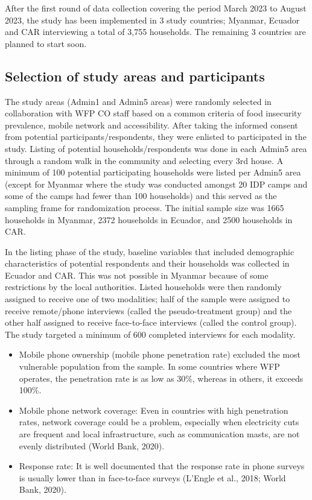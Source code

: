 \documentclass[11pt,harvard]{article}
\begin{document}
After the first round of data collection covering the period March 2023 to August 2023, the study has been implemented in 3 study countries; Myanmar, Ecuador and CAR interviewing a total of 3,755 households. The remaining 3 countries are planned to start soon.

	\subsection{Selection of study areas and participants}

The study areas (Admin1 and Admin5 areas) were randomly selected in collaboration with WFP CO staff based on a common criteria of food insecurity prevalence, mobile network and accessibility.
After taking the informed consent from potential participants/respondents, they were enlisted to participated in the study. Listing of potential households/respondents was done in each Admin5 area through a random walk in the community and selecting every 3rd house. A minimum of 100 potential participating households were listed per Admin5 area (except for Myanmar where the study was conducted amongst 20 IDP camps and some of the camps had fewer than 100 households) and this served as the sampling frame for randomization process. The initial sample size was 1665 households in Myanmar, 2372 households in Ecuador, and 2500 households in CAR. 

In the listing phase of the study, baseline variables that included demographic characteristics of potential respondents and their households was collected in Ecuador and CAR. This was not possible in Myanmar because of some restrictions by the local authorities. Listed households were then randomly assigned to receive one of two modalities; half of the sample were assigned to receive remote/phone interviews (called the pseudo-treatment group) and the other half assigned to receive face-to-face interviews (called the control group). The study targeted a minimum of 600 completed interviews for each modality.



\begin{itemize}[label=--, left=1.5em]
	\item Mobile phone ownership (mobile phone penetration rate) excluded the most vulnerable population from the sample. In some countries where WFP operates, the penetration rate is as low as 30\%, whereas in others, it exceeds 100\%.
	\item Mobile phone network coverage: Even in countries with high penetration rates, network coverage could be a problem, especially when electricity cuts are frequent and local infrastructure, such as communication masts, are not evenly distributed (World Bank, 2020).
	\item Response rate: It is well documented that the response rate in phone surveys is usually lower than in face-to-face surveys (L’Engle et al., 2018; World Bank, 2020).
\end{itemize}
\end{document}

